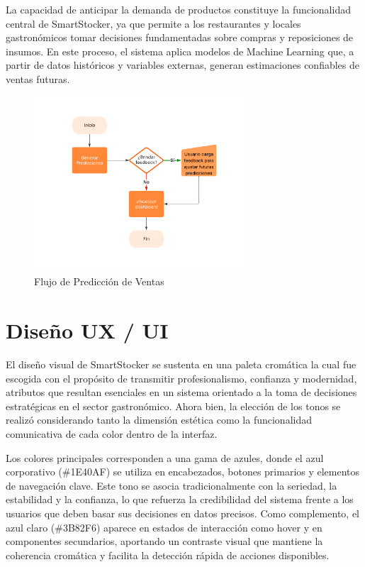 La capacidad de anticipar la demanda de productos constituye la funcionalidad central de SmartStocker, ya que permite a los restaurantes y locales gastronómicos tomar decisiones fundamentadas sobre compras y reposiciones de insumos. En este proceso, el sistema aplica modelos de Machine Learning que, a partir de datos históricos y variables externas, generan estimaciones confiables de ventas futuras.
\begin{figure}[htbp]
    \centering
    \includegraphics[width=0.7\textwidth]{images/DiagramaDePrediccionTesis.png}
    \caption{Flujo de Predicción de Ventas}
    \label{fig:flujo-prediccion}
\end{figure}

\section{Diseño UX / UI}

El diseño visual de SmartStocker se sustenta en una paleta cromática la cual fue escogida con el propósito de transmitir profesionalismo, confianza y modernidad, atributos que resultan esenciales en un sistema orientado a la toma de decisiones estratégicas en el sector gastronómico. Ahora bien, la elección de los tonos se realizó considerando tanto la dimensión estética como la funcionalidad comunicativa de cada color dentro de la interfaz.

Los colores principales corresponden a una gama de azules, donde el azul corporativo (\#1E40AF) se utiliza en encabezados, botones primarios y elementos de navegación clave. Este tono se asocia tradicionalmente con la seriedad, la estabilidad y la confianza, lo que refuerza la credibilidad del sistema frente a los usuarios que deben basar sus decisiones en datos precisos. Como complemento, el azul claro (\#3B82F6) aparece en estados de interacción como hover y en componentes secundarios, aportando un contraste visual que mantiene la coherencia cromática y facilita la detección rápida de acciones disponibles.

